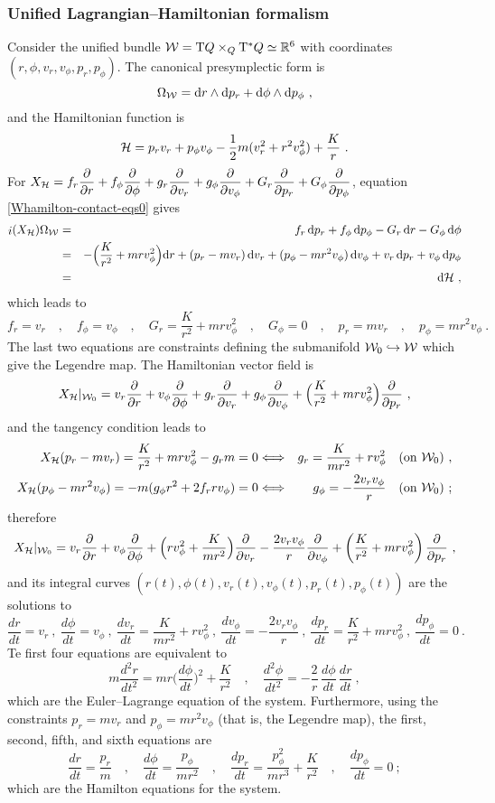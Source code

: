 \documentclass[12pt]{report}
\def\beann{\begin{eqnarray*}}
\def\eeann{\end{eqnarray*}}
\def\dst{\displaystyle}
\def\derpar#1#2{\frac{\partial{#1}}{\partial{#2}}}
\def\d{{\rm d}}
\def\Real{\mathbb{R}}
\def\Tan{{\rm T}}
\def\inn{\mathop{i}\nolimits}
\begin{document}
\subsubsection{Unified Lagrangian--Hamiltonian formalism}


Consider the unified bundle ${\cal W}=\Tan Q\times_Q\Tan^*Q\simeq\Real^6$
with coordinates $(r,\phi,v_r,v_\phi,p_r,p_\phi)$. 
The canonical presymplectic form is
$$
\Omega_{\cal W}=\d r \wedge\d p_r+\d\phi \wedge\d p_\phi \ ,
$$
and the Hamiltonian function is
$$
{\cal H}=p_rv_r+p_\phi v_\phi-\frac{1}{2}m(v_r^2+r^2v_\phi^2)+\frac{K}{r} \ .
$$
For $\displaystyle X_{\cal H}=f_r\derpar{}{r}+
f_\phi\derpar{}{\phi}+g_r\derpar{}{v_r}+g_\phi\derpar{}{v_\phi}+G_r\derpar{}{p_r}+G_\phi\derpar{}{p_\phi}$,
equation \eqref{Whamilton-contact-eqs0} gives
\beann
\inn(X_{\cal H})\Omega_{\cal W}&=&
 f_r\, \d p_r+f_\phi\, \d p_\phi-G_r\, \d r-G_\phi\, \d\phi
\\ &=&
-\Big(\frac{K}{r^2}+mrv_\phi^2\Big)\d r+(p_r-mv_r)\,\d v_r+(p_\phi-mr^2v_\phi)\,\d v_\phi+v_r\, \d p_r+v_\phi\, \d p_\phi
\\ &=& \d{\cal H}\ ,
\eeann
which leads to
$$
f_r=v_r \quad , \quad f_\phi=v_\phi \quad , \quad
G_r=\frac{K}{r^2}+mrv_\phi^2 \quad , \quad G_\phi=0 \quad , \quad
p_r=mv_r \quad , \quad p_\phi=mr^2v_\phi \ .
$$
The last two equations are constraints defining the submanifold
${\cal W}_0\hookrightarrow{\cal W}$ which give the Legendre map.
The Hamiltonian vector field is
$$
X_{\cal H}\vert_{{\cal W}_0}=
v_r\derpar{}{r}+v_\phi\derpar{}{\phi}+g_r\derpar{}{v_r}+g_\phi\derpar{}{v_\phi}
+\Big(\frac{K}{r^2}+mrv_\phi^2\Big)\derpar{}{p_r} \ ,
$$
and the tangency condition leads to
\beann
X_{\cal H}(p_r-mv_r)=\frac{K}{r^2}+mrv_\phi^2-g_rm=0 &\Longleftrightarrow&
g_r=\frac{K}{mr^2}+rv_\phi^2 \quad \mbox{\rm (on ${\cal W}_0$)} \ , \\
X_{\cal H}(p_\phi-mr^2v_\phi)=-m(g_\phi r^2+2f_rrv_\phi)=0 &\Longleftrightarrow&
g_\phi=-\frac{2v_rv_\phi}{r} \quad \mbox{\rm (on ${\cal W}_0$)} \ ;
\eeann
therefore
$$
X_{\cal H}\vert_{{\cal W}_0}=
v_r\derpar{}{r}+v_\phi\derpar{}{\phi}+
\Big(rv_\phi^2+\dst\frac{K}{mr^2}\Big)\derpar{}{v_r}-\frac{2v_rv_\phi}{r}\derpar{}{v_\phi}
+\left(\frac{K}{r^2}+mrv_\phi^2\right)\derpar{}{p_r} \ ,
$$
and its integral curves $(r(t),\phi(t),v_r(t),v_\phi(t),p_r(t),p_\phi(t))$ are the solutions to
$$
\frac{dr}{dt}=v_r \ , \
\frac{d\phi}{dt}=v_\phi \ , \
\frac{dv_r}{dt}=\frac{K}{mr^2}+rv_\phi^2 \ , \
\frac{dv_\phi}{dt}=-\frac{2v_rv_\phi}{r} \ , \
\frac{dp_r}{dt}=\frac{K}{r^2}+mrv_\phi^2 \ , \
\frac{dp_\phi}{dt}=0 \ .
$$
Te first four equations are equivalent to
$$
m\frac{d^2r}{dt^2}=mr\Big(\frac{d\phi}{dt}\Big)^2+\frac{K}{r^2}  \quad , \quad
 \frac{d^2\phi}{dt^2}=
-\frac{2}{r}\,\frac{d\phi}{dt}\,\frac{dr}{dt}\ ,
$$
which are the Euler--Lagrange equation of the system. 
Furthermore, using the constraints $p_r=mv_r$ 
and $p_\phi=mr^2v_\phi$ (that is, the Legendre map),
the first, second, fifth, and sixth equations are
$$
\frac{dr}{dt}=\frac{p_r}{m} \quad , \quad
\frac{d\phi}{dt}=\frac{p_\phi}{mr^2} \quad , \quad
\frac{dp_r}{dt}=\frac{p_\phi^2}{mr^3}+\frac{K}{r^2}  \quad , \quad
\frac{dp_\phi}{dt}=0 \ ;
$$
which are the Hamilton equations for the system.
\end{document}
